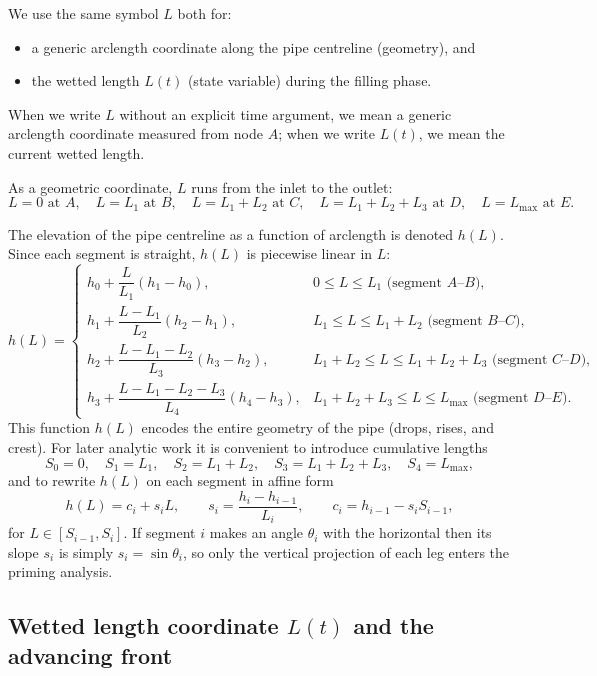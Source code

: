 \documentclass[11pt]{article}
\begin{document}
We use the same symbol $L$ both for:
\begin{itemize}
  \item a generic arclength coordinate along the pipe centreline (geometry), and
  \item the wetted length $L(t)$ (state variable) during the filling phase.
\end{itemize}
When we write $L$ without an explicit time argument, we mean a generic arclength coordinate
measured from node $A$; when we write $L(t)$, we mean the current wetted length.

As a geometric coordinate, $L$ runs from the inlet to the outlet:
\[
  L = 0 \text{ at } A,\quad
  L = L_1 \text{ at } B,\quad
  L = L_1 + L_2 \text{ at } C,\quad
  L = L_1 + L_2 + L_3 \text{ at } D,\quad
  L = L_{\max} \text{ at } E.
\]

The elevation of the pipe centreline as a function of arclength is denoted $h(L)$. Since
each segment is straight, $h(L)$ is piecewise linear in $L$:
\[
h(L) = \begin{cases}
  h_0 + \dfrac{L}{L_1}(h_1 - h_0), & 0 \le L \le L_1 \text{ (segment $A$--$B$)}, \\[1em]
  h_1 + \dfrac{L - L_1}{L_2}(h_2 - h_1), & L_1 \le L \le L_1 + L_2 \text{ (segment $B$--$C$)}, \\[1em]
  h_2 + \dfrac{L - L_1 - L_2}{L_3}(h_3 - h_2), & L_1 + L_2 \le L \le L_1 + L_2 + L_3 \text{ (segment $C$--$D$)}, \\[1em]
  h_3 + \dfrac{L - L_1 - L_2 - L_3}{L_4}(h_4 - h_3), & L_1 + L_2 + L_3 \le L \le L_{\max} \text{ (segment $D$--$E$)}.
\end{cases}
\]
This function $h(L)$ encodes the entire geometry of the pipe (drops, rises, and crest).
For later analytic work it is convenient to introduce cumulative lengths
\[
  S_0 = 0,\quad S_1 = L_1,\quad S_2 = L_1 + L_2,\quad S_3 = L_1 + L_2 + L_3,\quad S_4 = L_{\max},
\]
and to rewrite $h(L)$ on each segment in affine form
\begin{equation}
  h(L) = c_i + s_i L,\qquad
  s_i = \frac{h_i - h_{i-1}}{L_i},\qquad
  c_i = h_{i-1} - s_i S_{i-1},
  \label{eq:linear-hi}
\end{equation}
for $L\in [S_{i-1},S_i]$. If segment $i$ makes an angle $\theta_i$ with the horizontal then
its slope $s_i$ is simply $s_i = \sin\theta_i$, so only the vertical projection of each leg
enters the priming analysis.

\subsection{Wetted length coordinate $L(t)$ and the advancing front}
\end{document}
